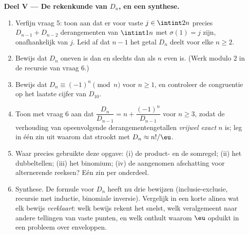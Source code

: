 \begin{problem}
\medskip
\noindent\textbf{Deel V --- De rekenkunde van $D_n$, en een synthese.}
\begin{enumerate}[resume]
  \item Verfijn vraag 5: toon aan dat er voor vaste $j \in \intint2n$
        precies $D_{n-1} + D_{n-2}$ derangementen van $\intint1n$ met
        $\sigma(1) = j$ zijn, onafhankelijk van $j$. Leid af dat $n - 1$
        het getal $D_n$ deelt voor elke $n \geq 2$.
  \item Bewijs dat $D_n$ oneven is dan en slechts dan als $n$ even is.
        (Werk modulo $2$ in de recursie van vraag 6.)
  \item Bewijs dat $D_n \equiv (-1)^n \pmod n$ voor $n \geq 1$, en
        controleer de congruentie op het laatste cijfer van $D_{10}$.
  \item Toon met vraag 6 aan dat $\dfrac{D_n}{D_{n-1}} = n +
        \dfrac{(-1)^n}{D_{n-1}}$ voor $n \geq 3$, zodat de verhouding
        van opeenvolgende derangementengetallen \emph{vrijwel exact} $n$
        is; leg in één zin uit waarom dat strookt met $D_n \approx
        n!/\eu$.
  \item Waar precies gebruikte deze opgave: (i) de product- en de
        somregel; (ii) het dubbeltellen; (iii) het binomium; (iv) de
        aangenomen afschatting voor alternerende reeksen? Eén zin per
        onderdeel.
  \item Synthese. De formule voor $D_n$ heeft nu drie bewijzen
        (inclusie-exclusie, recursie met inductie, binomiale inversie).
        Vergelijk in een korte alinea wat elk bewijs \emph{verklaart}:
        welk bewijs rekent het snelst, welk veralgemeent naar andere
        tellingen van vaste punten, en welk onthult waarom $\eu$
        opduikt in een probleem over enveloppen.
\end{enumerate}
\end{problem}

